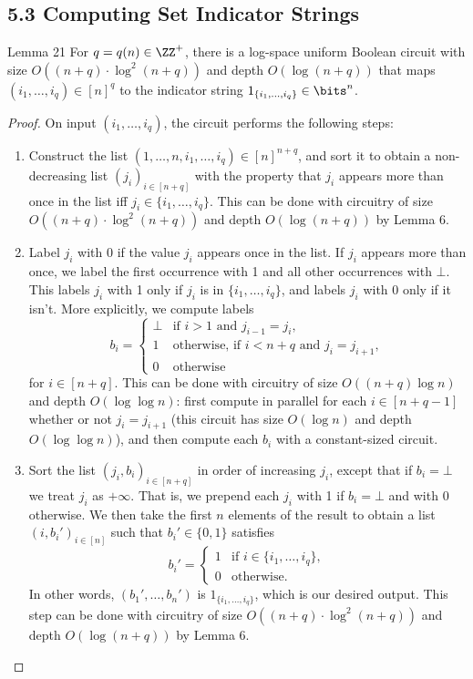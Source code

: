 \subsection*{5.3 Computing Set Indicator Strings}
\begin{originalresult}{Lemma 21}
For $q=q(n)\in\ZZ^+$, there is a log-space uniform Boolean circuit with size $O((n+q)\cdot\log^2(n+q))$ and depth $O(\log(n+q))$ that maps $(i_1,\ldots,i_q)\in[n]^q$ to the indicator string $1_{\{i_1,\ldots,i_q\}}\in\bits^n$.
\end{originalresult}
\begin{proof}
On input $(i_1,\ldots,i_q)$, the circuit performs the following steps:
\begin{enumerate}
\item Construct the list $(1,\ldots,n,i_1,\ldots,i_q)\in[n]^{n+q}$, and sort it to obtain a non-decreasing list $(j_i)_{i\in[n+q]}$ with the property that $j_i$ appears more than once in the list iff $j_i\in\{i_1,\ldots,i_q\}$. This can be done with circuitry of size $O((n+q)\cdot\log^2(n+q))$ and depth $O(\log(n+q))$ by Lemma 6.
\item Label $j_i$ with 0 if the value $j_i$ appears once in the list. If $j_i$ appears more than once, we label the first occurrence with 1 and all other occurrences with $\bot$. This labels $j_i$ with 1 only if $j_i$ is in $\{i_1,\ldots,i_q\}$, and labels $j_i$ with 0 only if it isn't. More explicitly, we compute labels
\[b_i=\begin{cases}\bot&\text{if }i>1\text{ and }j_{i-1}=j_i,\\1&\text{otherwise, if }i<n+q\text{ and }j_i=j_{i+1},\\0&\text{otherwise}\end{cases}\]
for $i\in[n+q]$. This can be done with circuitry of size $O((n+q)\log n)$ and depth $O(\log\log n)$: first compute in parallel for each $i\in[n+q-1]$ whether or not $j_i=j_{i+1}$ (this circuit has size $O(\log n)$ and depth $O(\log\log n)$), and then compute each $b_i$ with a constant-sized circuit.
\item Sort the list $(j_i,b_i)_{i\in[n+q]}$ in order of increasing $j_i$, except that if $b_i=\bot$ we treat $j_i$ as $+\infty$. That is, we prepend each $j_i$ with 1 if $b_i=\bot$ and with 0 otherwise. We then take the first $n$ elements of the result to obtain a list $(i,b_i')_{i\in[n]}$ such that $b_i'\in\{0,1\}$ satisfies
\[b_i'=\begin{cases}1&\text{if }i\in\{i_1,\ldots,i_q\},\\0&\text{otherwise}.\end{cases}\]
In other words, $(b_1',\ldots,b_n')$ is $1_{\{i_1,\ldots,i_q\}}$, which is our desired output. This step can be done with circuitry of size $O((n+q)\cdot\log^2(n+q))$ and depth $O(\log(n+q))$ by Lemma 6.
\end{enumerate}
\end{proof}
